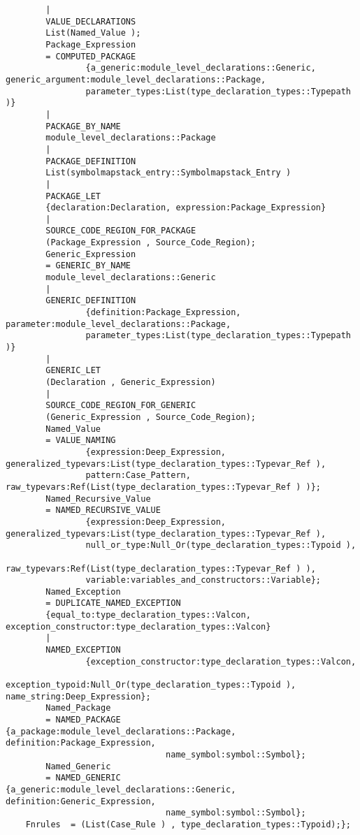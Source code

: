 \begin{verbatim}
        |
        VALUE_DECLARATIONS
        List(Named_Value );
        Package_Expression
        = COMPUTED_PACKAGE
                {a_generic:module_level_declarations::Generic, generic_argument:module_level_declarations::Package,
                parameter_types:List(type_declaration_types::Typepath )}
        |
        PACKAGE_BY_NAME
        module_level_declarations::Package
        |
        PACKAGE_DEFINITION
        List(symbolmapstack_entry::Symbolmapstack_Entry )
        |
        PACKAGE_LET
        {declaration:Declaration, expression:Package_Expression}
        |
        SOURCE_CODE_REGION_FOR_PACKAGE
        (Package_Expression , Source_Code_Region);
        Generic_Expression
        = GENERIC_BY_NAME
        module_level_declarations::Generic
        |
        GENERIC_DEFINITION
                {definition:Package_Expression, parameter:module_level_declarations::Package,
                parameter_types:List(type_declaration_types::Typepath )}
        |
        GENERIC_LET
        (Declaration , Generic_Expression)
        |
        SOURCE_CODE_REGION_FOR_GENERIC
        (Generic_Expression , Source_Code_Region);
        Named_Value
        = VALUE_NAMING
                {expression:Deep_Expression, generalized_typevars:List(type_declaration_types::Typevar_Ref ),
                pattern:Case_Pattern, raw_typevars:Ref(List(type_declaration_types::Typevar_Ref ) )};
        Named_Recursive_Value
        = NAMED_RECURSIVE_VALUE
                {expression:Deep_Expression, generalized_typevars:List(type_declaration_types::Typevar_Ref ),
                null_or_type:Null_Or(type_declaration_types::Typoid ),
                raw_typevars:Ref(List(type_declaration_types::Typevar_Ref ) ),
                variable:variables_and_constructors::Variable};
        Named_Exception
        = DUPLICATE_NAMED_EXCEPTION
        {equal_to:type_declaration_types::Valcon, exception_constructor:type_declaration_types::Valcon}
        |
        NAMED_EXCEPTION
                {exception_constructor:type_declaration_types::Valcon,
                exception_typoid:Null_Or(type_declaration_types::Typoid ), name_string:Deep_Expression};
        Named_Package
        = NAMED_PACKAGE         {a_package:module_level_declarations::Package, definition:Package_Expression,
                                name_symbol:symbol::Symbol};
        Named_Generic
        = NAMED_GENERIC         {a_generic:module_level_declarations::Generic, definition:Generic_Expression,
                                name_symbol:symbol::Symbol};
    Fnrules  = (List(Case_Rule ) , type_declaration_types::Typoid);};
\end{verbatim}
